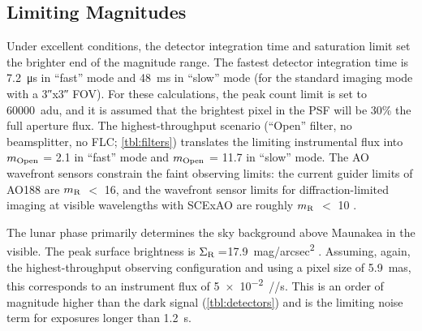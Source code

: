 \subsection{Limiting Magnitudes}

Under excellent conditions, the detector integration time and saturation limit set the brighter end of the magnitude range. The fastest detector integration time is \SI{7.2}{\micro\second} in ``fast'' mode and \SI{48}{\milli\second} in ``slow'' mode (for the standard imaging mode with a \ang{;;3}x\ang{;;3} FOV). For these calculations, the peak count limit is set to \SI{60000}{adu}, and it is assumed that the brightest pixel in the PSF will be 30\% the full aperture flux. The highest-throughput scenario (``Open'' filter, no beamsplitter, no FLC; \autoref{tbl:filters}) translates the limiting instrumental flux into $m_{\rm Open}$ = 2.1 in ``fast'' mode and $m_{\rm Open}$ = 11.7 in ``slow'' mode. The AO wavefront sensors constrain the faint observing limits: the current guider limits of AO188 are $m_{\rm R}$ $<$ 16, and the wavefront sensor limits for diffraction-limited imaging at visible wavelengths with SCExAO are roughly $m_{\rm R}$ $<$ 10 \citep{ahn_development_2023}.

The lunar phase primarily determines the sky background above Maunakea in the visible. The peak surface brightness is $\Sigma_{\rm R}=$\SI{17.9}{mag/arcsec^2} \citep{roth_measurements_2016}. Assuming, again, the highest-throughput observing configuration and using a pixel size of \SI{5.9}{mas}, this corresponds to an instrument flux of \SI{5e-2}{\electron/\pixel/\second}. This is an order of magnitude higher than the dark signal (\autoref{tbl:detectors}) and is the limiting noise term for exposures longer than \SI{1.2}{\second}.
